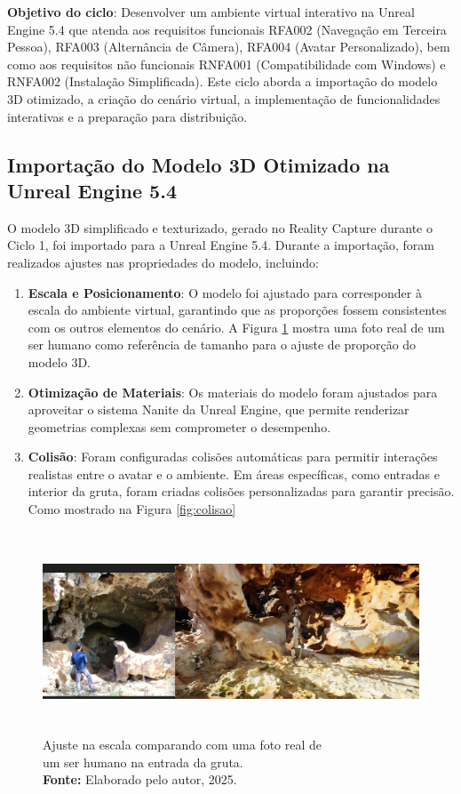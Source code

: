 \textbf{Objetivo do ciclo}: Desenvolver um ambiente virtual interativo na Unreal Engine 5.4 que atenda aos requisitos funcionais RFA002 (Navegação em Terceira Pessoa), RFA003 (Alternância de Câmera), RFA004 (Avatar Personalizado), bem como aos requisitos não funcionais RNFA001 (Compatibilidade com Windows) e RNFA002  (Instalação Simplificada). Este ciclo aborda a importação do modelo 3D otimizado, a criação do cenário virtual, a implementação de funcionalidades interativas e a preparação para distribuição.

\subsection{Importação do Modelo 3D Otimizado na Unreal Engine 5.4}
O modelo 3D simplificado e texturizado, gerado no Reality Capture durante o Ciclo 1, foi importado para a Unreal Engine 5.4. Durante a importação, foram realizados ajustes nas propriedades do modelo, incluindo:
\begin{enumerate}
    \item \textbf{Escala e Posicionamento}: O modelo foi ajustado para corresponder à escala do ambiente virtual, garantindo que as proporções fossem consistentes com os outros elementos do cenário. A Figura \ref{fig:escala} mostra uma foto real de um ser humano como referência de tamanho para o ajuste de proporção do modelo 3D.
    \item \textbf{Otimização de Materiais}: Os materiais do modelo foram ajustados para aproveitar o sistema Nanite da Unreal Engine, que permite renderizar geometrias complexas sem comprometer o desempenho.
    \item \textbf{Colisão}: Foram configuradas colisões automáticas para permitir interações realistas entre o avatar e o ambiente. Em áreas específicas, como entradas e interior da gruta, foram criadas colisões personalizadas para garantir precisão. Como mostrado na Figura \ref{fig:colisao}
\end{enumerate}

\begin{figure}[H]
        \centering
        \includegraphics[height=6cm, keepaspectratio]{img/unreal/escala.png}
        \caption{Ajuste na escala comparando com uma foto real de\\ um ser humano na entrada da gruta. \\
            \textbf{Fonte:} Elaborado pelo autor, 2025.}
        \label{fig:escala}
\end{figure}

